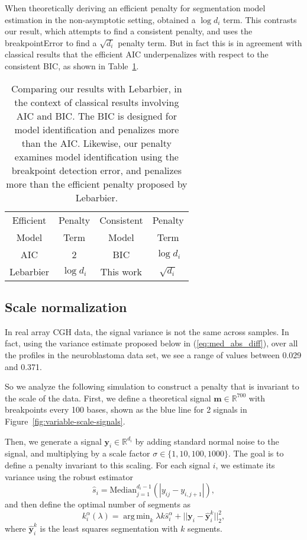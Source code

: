\documentclass{jsfds} %
\DeclareMathOperator*{\argmin}{arg\,min}
\newcommand{\RR}{\mathbb{R}}
\begin{document}
When theoretically deriving an efficient penalty for segmentation
model estimation in the non-asymptotic setting, \citet{lebarbier}
obtained a $\log d_i$ term. This contrasts our result, which attempts
to find a consistent penalty, and uses the breakpointError to find a
$\sqrt{d_i}$ penalty term. But in fact this is in agreement with
classical results that the efficient AIC underpenalizes with respect
to the consistent BIC, as shown in Table~\ref{tab:AIC-BIC}.

\begin{table}[H]
  \centering
  \begin{tabular}{cc|cc}
     Efficient & Penalty & Consistent & Penalty \\
     Model & Term & Model & Term\\
     \hline
     AIC & 2 & BIC & $\log d_i$\\
     Lebarbier & $\log d_i$ & This work & $\sqrt{d_i}$\\
  \end{tabular}
  \caption{Comparing our results with Lebarbier, 
in the context of classical results involving AIC and BIC. 
The BIC is designed for model identification and penalizes more than the AIC.
Likewise, our penalty examines model identification using the breakpoint
detection error, and penalizes more than the efficient penalty proposed
by Lebarbier.}
  \label{tab:AIC-BIC}
\end{table}

\newpage

\subsection{Scale normalization}
\label{variable_scale}
In real array CGH data, the signal variance is not the same across
samples. In fact, using the variance estimate proposed below in
(\ref{eq:med_abs_diff}), over all the profiles in the
neuroblastoma data set, we see a range of values between 0.029 and
0.371.

So we analyze the following simulation to construct a penalty that is
invariant to the scale of the data. First, we define a theoretical
signal $\mathbf m\in\RR^{700}$ with breakpoints every 100 bases, shown as
the blue line for 2 signals in
Figure~\ref{fig:variable-scale-signals}.

Then, we generate a signal $\mathbf y_i\in\RR^{d_i}$ by adding standard normal
noise to the signal, and multiplying by a scale factor
$\sigma\in\{1,10,100,1000\}$. The goal is to define a penalty
invariant to this scaling.
For each signal $i$, we estimate its
variance using the robust estimator
\begin{equation}
  \label{eq:med_abs_diff}
  \hat s_i = \text{Median}_{j=1}^{d_i-1}
\left(|y_{ij}-y_{i,j+1}|\right),
\end{equation}
and then define the optimal number of segments as
\begin{equation}
  \label{eq:kstar_shat}
  k_i^\alpha(\lambda) = \argmin_k \lambda k \hat s_i^\alpha 
+ ||\mathbf y_i - \mathbf{\hat y}_i^k||^2_2,
\end{equation}
where $\mathbf{\hat y}_i^k$ is the least squares segmentation with $k$
segments.
\end{document}
